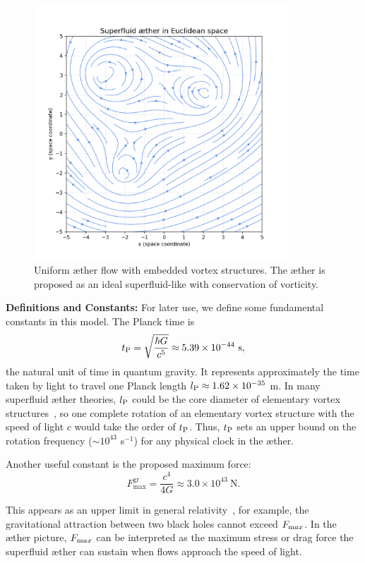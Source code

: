 \begin{figure}[htbp]
    \centering
    \includegraphics[width=0.85\textwidth]{images/04-ÆtherSuperfluïde}
    \caption{Uniform æther flow with embedded vortex structures. The æther is proposed as an ideal superfluid-like with conservation of vorticity.}
    \label{fig:ÆtherSuperfluïde}
\end{figure}


\textbf{Definitions and Constants:} For later use, we define some fundamental constants in this model. The Planck time is
\[
    t_{\textrm P} = \sqrt{\frac{\hbar G}{c^5}} \approx 5.39\times10^{-44}\ \text{s},
\]
the natural unit of time in quantum gravity. It represents approximately the time taken by light to travel one Planck length $l_{\textrm P} \approx 1.62\times10^{-35}$ m. In many superfluid æther theories, $l_{\textrm P}$ could be the core diameter of elementary vortex structures~\cite{Winterberg2002-PlanckÆther}, so one complete rotation of an elementary vortex structure with the speed of light $c$ would take the order of $t_{\textrm P}$. Thus, $t_{\textrm P}$ sets an upper bound on the rotation frequency ($\sim 10^{43}$ s$^{-1}$) for any physical clock in the æther.

Another useful constant is the proposed maximum force:
\begin{equation*}
    F^{\text{gr}}_{\text{max}} = \frac{c^4}{4G} \approx 3.0\times10^{43}\ \text{N}.
\end{equation*}

This appears as an upper limit in general relativity~\cite{Schiller2022-maxforce}, for example, the gravitational attraction between two black holes cannot exceed $F_{\textrm max}$. In the æther picture, $F_{\textrm max}$ can be interpreted as the maximum stress or drag force the superfluid æther can sustain when flows approach the speed of light.

